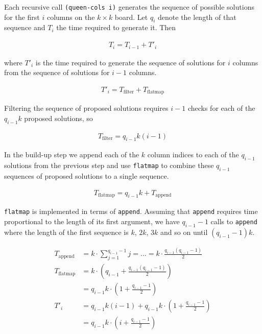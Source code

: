 \documentclass{article}
\begin{document}
Each recursive call \texttt{(queen-cols i)} generates the sequence of possible solutions for the first \(i\) columns on the \(k \times k\) board. Let \(q_i\) denote the length of that sequence and \(T_i\) the time required to generate it. Then 

\begin{align*}
    T_i = T_{i-1} + T'_i
\end{align*}

\noindent where \(T'_i\) is the time required to generate the sequence of solutions for \(i\) columns from the sequence of solutions for \(i-1\) columns.

\begin{align*}
    T'_i = T_\text{filter} + T_\text{flatmap}
\end{align*}

Filtering the sequence of proposed solutions requires \(i - 1\) checks for each of the \(q_{i-1}k\) proposed solutions, so 

\begin{align*}
T_\text{filter} = q_{i-1}k(i-1)
\end{align*}

In the build-up step we append each of the \(k\) column indices to each of the \(q_{i-1}\) solutions from the previous step and use \texttt{flatmap} to combine these \(q_{i-1}\) sequences of proposed solutions to a single sequence.

\begin{align*}
    T_\text{flatmap} = q_{i-1}k + T_\text{append}
\end{align*}

\texttt{flatmap} is implemented in terms of \texttt{append}. Assuming that \texttt{append} requires time proportional to the length of its first argument, we have \(q_{i-1} - 1\) calls to \texttt{append} where the length of the first sequence is \(k\), \(2k\), \(3k\) and so on until \((q_{i-1} - 1)k\).

\begin{align*}
    T_\text{append} &= k \cdot \displaystyle \sum_{j=1}^{q_{i-1}-1} j = ... = k \cdot \frac{q_{i-1}(q_{i-1}-1)}{2} \\
    T_\text{flatmap}&= k \cdot \left( q_{i-1} + \frac{q_{i-1}(q_{i-1}-1)}{2} \right) \\
                    &= q_{i-1}k \cdot \left( 1 + \frac{q_{i-1}-1}{2} \right) \\
    T'_i &= q_{i-1}k(i-1) + q_{i-1}k \cdot \left( 1 + \frac{q_{i-1}-1}{2} \right) \\
         &= q_{i-1}k \cdot \left( i + \frac{q_{i-1}-1}{2}\right)
\end{align*}
\end{document}
